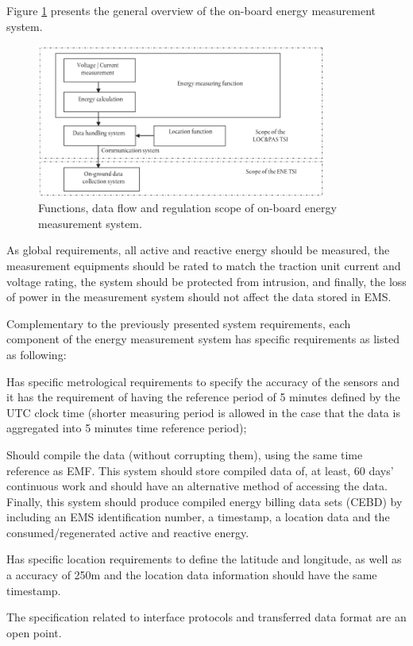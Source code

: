 Figure \ref{fig:EMS} presents the general overview of the on-board energy measurement system.

\begin{figure}[h!]
	\centering
	\includegraphics[width=0.85\textwidth,keepaspectratio]{figures/EMS}
	\caption{Functions, data flow and regulation scope of on-board energy measurement system.}
	\label{fig:EMS}
\end{figure}

As global requirements, all active and reactive energy should be measured, the measurement equipments should be rated to match the traction unit current and voltage rating, the system should be protected from intrusion, and finally, the loss of power in the  measurement system should not affect the data stored in EMS.

Complementary to the previously presented system requirements, each component of the energy measurement system has specific requirements as listed as following:

\begin{description}
	\setlength\itemsep{-0.5em}
	
	\item [Energy measurement function (EMF)] Has specific metrological requirements to specify the accuracy of the sensors and it has the requirement of having the reference period of 5 minutes defined by the UTC clock time (shorter measuring period is allowed in the case that the data is aggregated into 5 minutes time reference period);
	
	\item [Data handling system (DHS)] Should compile the data (without corrupting them), using the same time reference as EMF. This system should store compiled data of, at least, 60 days' continuous work and should have an alternative method of accessing the data. Finally, this system should produce compiled energy billing data sets (CEBD) by including an EMS identification number, a timestamp, a location data and the consumed/regenerated active and reactive energy.
	
	\item [Location function] Has specific location requirements to define the latitude and longitude, as well as a accuracy of 250m and the location data information should have the same timestamp.
	
	\item [On-board to ground communication] The specification related to interface protocols and transferred data format are an open point.
	
\end{description} 


